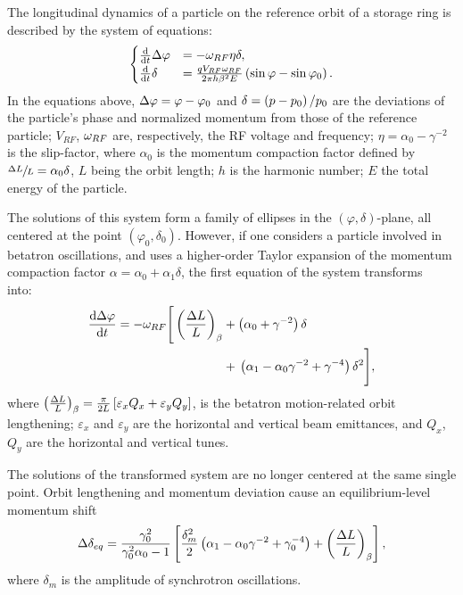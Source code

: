 The longitudinal dynamics of a particle on the reference orbit of a storage ring is described
by the system of equations:
\begin{equation}
  \begin{cases}
    \ddt{}\D\varphi &= -\w_{RF}\eta\delta, \\
    \ddt{}\delta &= \frac{q V_{RF}\w_{RF}}{2\pi h\beta^2E}\bkt{\sin\varphi - \sin\varphi_0}.
  \end{cases}
\end{equation}
In the equations above, $\Delta\varphi = \varphi - \varphi_0$ and
$\delta = \bkt{p-p_0}/{p_0}$ are the deviations of the particle's phase and
normalized momentum from those of the reference particle;
$V_{RF}$, $\omega_{RF}$ are, respectively,
the RF voltage and frequency; $\eta = \alpha_0 - \gamma^{-2}$ is the slip-factor,
where $\alpha_0$ is the momentum compaction factor defined by $\sfrac{\Delta L}{L} = \alpha_0\delta$,
$L$ being the orbit length; $h$ is the harmonic number; $E$ the total energy of the particle.

The solutions of this system form a family of ellipses in the $(\varphi, \delta)$-plane, all centered at the
point $(\varphi_0,\delta_0)$. However, if one considers a particle involved in betatron oscillations, and
uses a higher-order Taylor expansion of the momentum compaction factor
$\alpha = \alpha_0 + \alpha_1\delta$, the first equation of the system
transforms into:~\cite[p.~2579]{Senichev:IPAC13}
\begin{align*}
  \ddt{\D\varphi} = -\w_{RF} \Bigg[\bkt{\frac{\Delta L}{L}}_\beta &+ \bkt{\alpha_0 + \gamma^{-2}}\delta \Bigg.\\
    &+ \Bigg.\bkt{\alpha_1 - \alpha_0\gamma^{-2} + \gamma^{-4}}\delta^2\Bigg],
\end{align*}
where $\bkt{\frac{\Delta L}{L}}_\beta = \frac{\pi}{2L}\bkt*{\varepsilon_xQ_x + \varepsilon_yQ_y}$, is
the betatron motion-related orbit lengthening; $\varepsilon_x$ and $\varepsilon_y$ are
the horizontal and vertical beam emittances, and $Q_x$, $Q_y$ are the horizontal and vertical tunes.

The solutions of the transformed system are no longer centered at the same single point. Orbit lengthening
and momentum deviation cause an equilibrium-level momentum shift~\cite[p.~2581]{Senichev:IPAC13}
\begin{equation}\label{eq:EquLevMom_shift}
\Delta\delta_{eq} = \frac{\gamma_0^2}{\gamma_0^2\alpha_0 - 1}\bkt*{\frac{\delta_m^2}{2}\bkt{\alpha_1 - \alpha_0\gamma^{-2} + \gamma_0^{-4}} + \bkt{\frac{\Delta L}{L}}_\beta},
\end{equation}
where $\delta_m$ is the amplitude of synchrotron oscillations.

